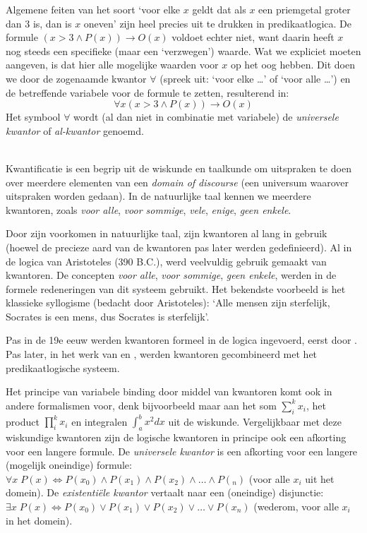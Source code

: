 Algemene feiten van het soort `voor elke $x$ geldt dat als $x$ een priemgetal groter dan 3 is, dan is $x$ oneven' zijn heel precies uit te drukken in predikaatlogica. De formule $(x>3\wedge P(x))\rightarrow O(x)$ voldoet echter niet, want daarin heeft $x$ nog steeds een specifieke (maar een `verzwegen') waarde. Wat we expliciet moeten aangeven, is dat hier alle mogelijke waarden voor $x$ op het oog hebben. Dit doen we door de zogenaamde kwantor $\forall$ (spreek uit: `voor elke \ldots' of `voor alle \ldots') en de betreffende variabele voor de formule te zetten, resulterend in:
$$\forall x(x>3\wedge P(x))\rightarrow O(x)$$
Het symbool $\forall$ wordt (al dan niet in combinatie met variabele) de \textit{universele kwantor} of \textit{al-kwantor} genoemd.

\begin{aside}\mbox{}\\
Kwantificatie is een begrip uit de wiskunde en taalkunde om uitspraken te doen over meerdere elementen van een \textit{domain of discourse} (een universum waarover uitspraken worden gedaan). In de natuurlijke taal kennen we meerdere kwantoren, zoals \textit{voor alle}, \textit{voor sommige}, \textit{vele}, \textit{enige}, \textit{geen enkele}.

Door zijn voorkomen in natuurlijke taal, zijn kwantoren al lang in gebruik (hoewel de precieze aard van de kwantoren pas later werden gedefinieerd). Al in de logica van Aristoteles (390 B.C.), werd veelvuldig gebruik gemaakt van kwantoren. De concepten \textit{voor alle}, \textit{voor sommige}, \textit{geen enkele}, werden in de formele redeneringen van dit systeem gebruikt. Het bekendste voorbeeld is het klassieke syllogisme (bedacht door Aristoteles): `Alle mensen zijn sterfelijk, Socrates is een mens, dus Socrates is sterfelijk'.

Pas in de 19e eeuw werden kwantoren formeel in de logica ingevoerd, eerst door \citet{demorgan}. Pas later, in het werk van \citet{frege:begriffschrift} en \citet{russel:principia:1,russel:principia:2,russel:principia:3}, werden kwantoren gecombineerd met het predikaatlogische systeem.

Het principe van variabele binding door middel van kwantoren komt ook in andere formalismen voor, denk bijvoorbeeld maar aan het som $\sum^k_i x_i$, het product $\prod^k_i x_i$ en integralen $\int_{a}^{b} x^2 dx$ uit de wiskunde. Vergelijkbaar met deze wiskundige kwantoren zijn de logische kwantoren in principe ook een afkorting voor een langere formule. De \textit{universele kwantor} is een afkorting voor een langere (mogelijk oneindige) formule: $\forall x\;P(x) \Leftrightarrow P(x_0)\wedge P(x_1)\wedge P(x_2)\wedge\ldots\wedge P(_n)$ (voor alle $x_i$ uit het domein). De \textit{existenti\"ele kwantor} vertaalt naar een (oneindige) disjunctie: $\exists x\;P(x)\Leftrightarrow P(x_0)\vee P(x_1)\vee P(x_2)\vee\ldots\vee P(x_n)$ (wederom, voor alle $x_i$ in het domein).
\end{aside}

